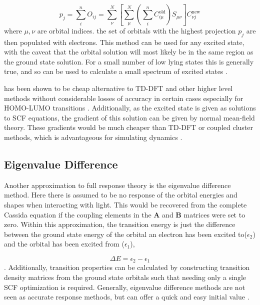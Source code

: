 \begin{equation}
p_j = \sum^n_i O_{ij} = \sum^N_\nu \left[\sum^N_\mu\left(\sum^n_i C_{i\mu}^{\text{old}}\right)S_{\mu\nu}\right]C^{\text{new}}_{\nu j}
\end{equation}
%
where $\mu,\nu$ are orbital indices. the set of orbitals with the highest projection
$p_j$ are then populated with electrons.  This method can be used for any
excited state, with the caveat that the orbital solution will most likely be in
the same region as the ground state solution. For a small number of low lying states
this is generally true, and so \dscf can be used to calculate a small spectrum of
excited states \cite{Gilbert2008}.

\dscf has been shown to be cheap alternative to TD-DFT and other higher level
methods \cite{Liu2004, Gavnholt2008, Besley2009} without considerable losses of
accuracy in certain cases especially for HOMO-LUMO transitions \cite{Kowalczyk2011}.
Additionally, as the excited state is given as solutions to SCF equations, the gradient
of this solution can be given by normal mean-field theory. These gradients would
be much cheaper than TD-DFT or coupled cluster methods, which is advantageous for simulating
dynamics \cite{Gavnholt2008}.

\subsection{Eigenvalue Difference}
\label{subsec:eigval_diff}
Another approximation to full response theory is the eigenvalue difference method. 
Here there is assumed to be no response of the orbital energies and shapes when 
interacting with light. This would be recovered from the complete Cassida equation
if the coupling elements in the $\mathbf{A}$ and $\mathbf{B}$ matrices were set to zero.
Within this approximation, the transition energy is just the difference between 
the ground state energy of the orbital an electron has been excited to($\epsilon_{\text{2}}$)
and the orbital has been excited from ($\epsilon_{\text{1}}$),

\begin{equation}
\Delta E = \epsilon_{\text{2}} - \epsilon_{\text{1}}
\end{equation}
%
. Additionally, transition properties can be calculated by constructing transition 
density matrices from the ground state orbitals such that needing only a single 
SCF optimization is required. Generally, eigenvalue difference methods are not 
seen as accurate response methods, but can offer a quick and easy initial value 
\cite{Gimon2009}.

